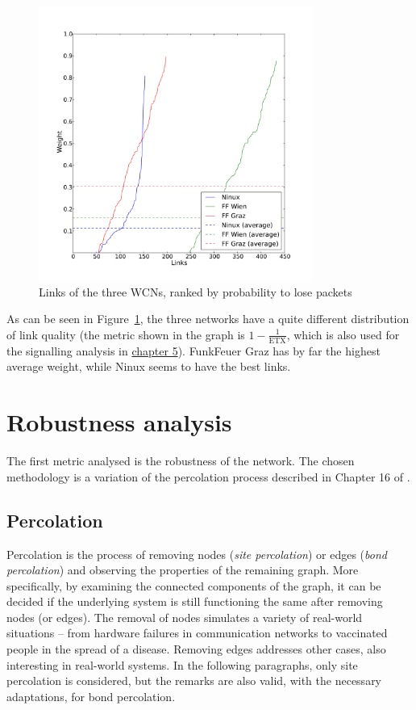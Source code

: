 \documentclass[a4paper,11pt,twoside,openright]{memoir}
\newcommand{\figref}[1] {Figure~\ref{#1}}
\newcommand{\etx}{\mathrm{ETX}}
\begin{document}
\begin{figure}[htb]
\centering
\includegraphics[width=0.8\textwidth]{graphs/weight_rank.pdf}
\caption{Links of the three WCNs, ranked by probability to lose packets}
\label{fig:wcn-link-ranking}
\end{figure}

As can be seen in \figref{fig:wcn-link-ranking}, the three networks have a quite
different distribution of link quality (the metric shown in the graph is
$1 - \frac{1}{\etx}$, which is also used for the signalling analysis in
\hyperref[message-propagation-analysis]{chapter 5}). FunkFeuer Graz has by far the highest average
weight, while Ninux seems to have the best links.

\chapter{Robustness analysis}\label{robustness-analysis}

The first metric analysed is the robustness of the network. The chosen
methodology is a variation of the percolation process described in
Chapter 16 of \cite{newman_networks:_2010}.

\section{Percolation}\label{percolation}

Percolation is the process of removing nodes (\emph{site percolation})
or edges (\emph{bond percolation}) and observing the properties of the
remaining graph. More specifically, by examining the connected
components of the graph, it can be decided if the underlying system is
still functioning the same after removing nodes (or edges). The removal
of nodes simulates a variety of real-world situations -- from hardware
failures in communication networks to vaccinated people in the spread
of a disease. Removing edges addresses other cases, also interesting in
real-world systems. In the following paragraphs, only site percolation
is considered, but the remarks are also valid, with the necessary
adaptations, for bond percolation.
\end{document}
